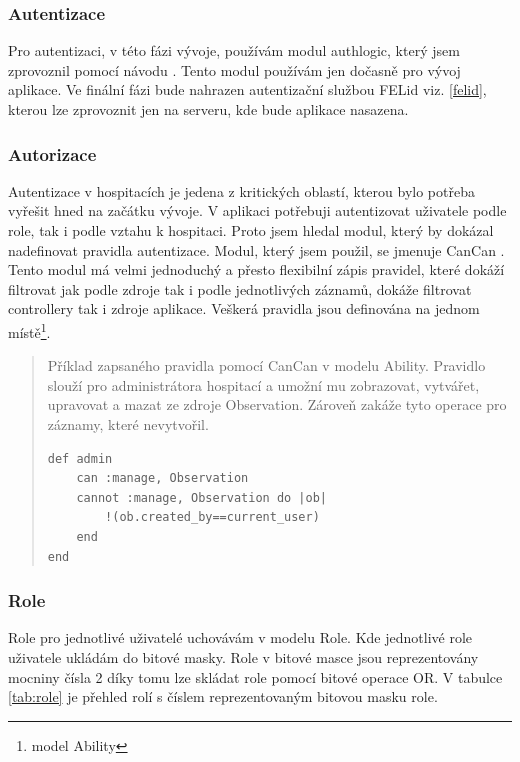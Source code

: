 \subsubsection{Autentizace}
Pro autentizaci, v této fázi vývoje, používám modul authlogic, který jsem zprovoznil pomocí návodu \cite{authlogic}. Tento modul používám jen dočasně pro vývoj aplikace. Ve finální fázi bude nahrazen autentizační službou FELid viz. \ref{felid}, kterou lze zprovoznit jen na serveru, kde bude aplikace nasazena. 

\subsubsection{Autorizace}
Autentizace v hospitacích je jedena z kritických oblastí, kterou bylo potřeba vyřešit hned na začátku vývoje. V aplikaci potřebuji autentizovat uživatele podle role, tak i podle vztahu k hospitaci. Proto jsem hledal modul, který by dokázal nadefinovat pravidla autentizace. Modul, který jsem použil, se jmenuje CanCan \cite{cancan} . Tento modul má velmi jednoduchý a přesto flexibilní zápis pravidel, které dokáží filtrovat jak podle zdroje tak i podle jednotlivých záznamů, dokáže filtrovat controllery tak i zdroje aplikace.  Veškerá pravidla jsou definována na jednom místě\footnote{model Ability}.

\begin{quote}
Příklad zapsaného pravidla pomocí CanCan v modelu Ability. Pravidlo slouží pro administrátora hospitací a umožní mu zobrazovat, vytvářet, upravovat a mazat ze zdroje Observation. Zároveň zakáže tyto operace pro záznamy, které nevytvořil.

\begin{verbatim}
def admin
    can :manage, Observation
    cannot :manage, Observation do |ob|
        !(ob.created_by==current_user)
    end
end
\end{verbatim} 
\end{quote}

\subsubsection{Role}
Role pro jednotlivé uživatelé uchovávám v modelu Role. Kde jednotlivé role uživatele ukládám do bitové masky. Role v bitové masce jsou reprezentovány mocniny čísla 2 díky tomu lze skládat role pomocí bitové operace OR. V tabulce \ref{tab:role} je přehled rolí s číslem reprezentovaným bitovou masku role.

